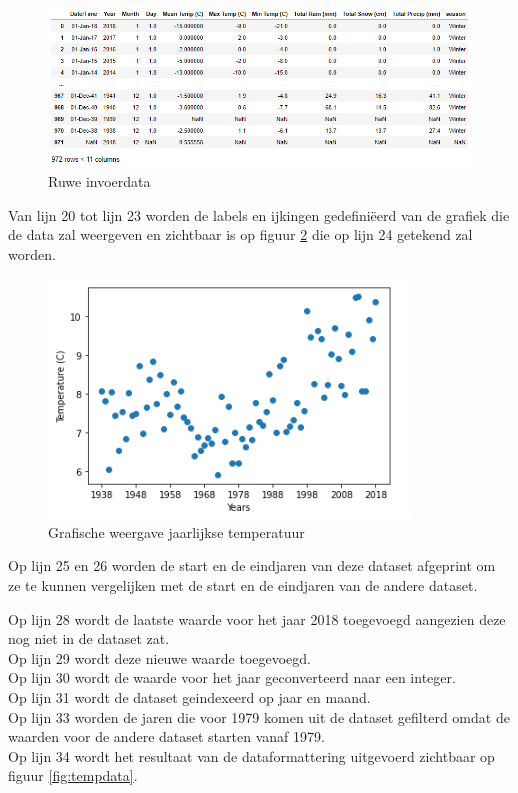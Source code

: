 \begin{figure}
    \centering
    \caption{Ruwe invoerdata}
    \label{fig:tempdataraw.png}
    \includegraphics[width=1\linewidth]{temp_data_rawpng}
\end{figure}


Van lijn 20 tot lijn 23 worden de labels en ijkingen gedefini\"{e}erd van de grafiek die de data zal weergeven en zichtbaar is op figuur \ref{fig:tempdatagraph} die op lijn 24 getekend zal worden. \\



\begin{figure}
    \caption{Grafische weergave jaarlijkse temperatuur}
    \label{fig:tempdatagraph}
    \centering
    \includegraphics[width=0.7\linewidth]{temp_data_graph}
\end{figure}

Op lijn 25 en 26 worden de start en de eindjaren van deze dataset afgeprint om ze te kunnen vergelijken met de start en de eindjaren van de andere dataset.

Op lijn 28 wordt de laatste waarde voor het jaar 2018 toegevoegd aangezien deze nog niet in de dataset zat. \\
Op lijn 29 wordt deze nieuwe waarde toegevoegd.\\

Op lijn 30 wordt de waarde voor het jaar geconverteerd naar een integer. \\
Op lijn 31 wordt de dataset geindexeerd op jaar en maand. \\
Op lijn 33 worden de jaren die voor 1979 komen uit de dataset gefilterd omdat de waarden voor de andere dataset starten vanaf 1979.\\
Op lijn 34 wordt het resultaat van de dataformattering uitgevoerd zichtbaar op figuur \ref{fig:tempdata}.




